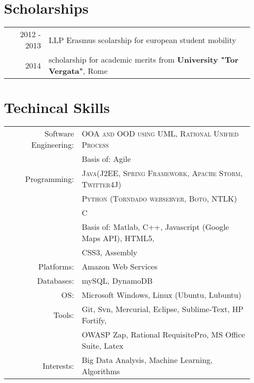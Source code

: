 \documentclass[a4paper,10pt]{article} %
\begin{document}

\section{Scholarships}

\begin{tabular}{rl}
2012 - 2013 & LLP Erasmus scolarship for european student mobility \\

2014 & scholarship for academic merits from \textbf{University "Tor Vergata"}, Rome\\
\end{tabular}




\section{Techincal Skills}

\begin{tabular}{rl}
Software Engineering: & \textsc{OOA and OOD using UML, Rational Unified Process} \\
& Basis of: Agile \\
Programming: & \textsc{Java(J2EE, Spring Framework, Apache Storm, Twitter4J)}
\\ & \textsc{Python (Torndado webserver, Boto, NTLK)}
\\ &\textsc{C}
\\ & Basis of: Matlab, C++, Javascript (Google Maps API), HTML5,
\\ & CSS3, Assembly \\
Platforms: & Amazon Web Services\\
Databases: & mySQL, DynamoDB\\
OS: & Microsoft Windows, Linux  (Ubuntu, Lubuntu)\\
Tools: & Git, Svn, Mercurial, Eclipse, Sublime-Text, HP Fortify,
\\ & OWASP Zap, Rational RequisitePro, MS Office Suite, Latex \\
Interests: & Big Data Analysis, Machine Learning, Algorithms
\end{tabular}
\end{document}

